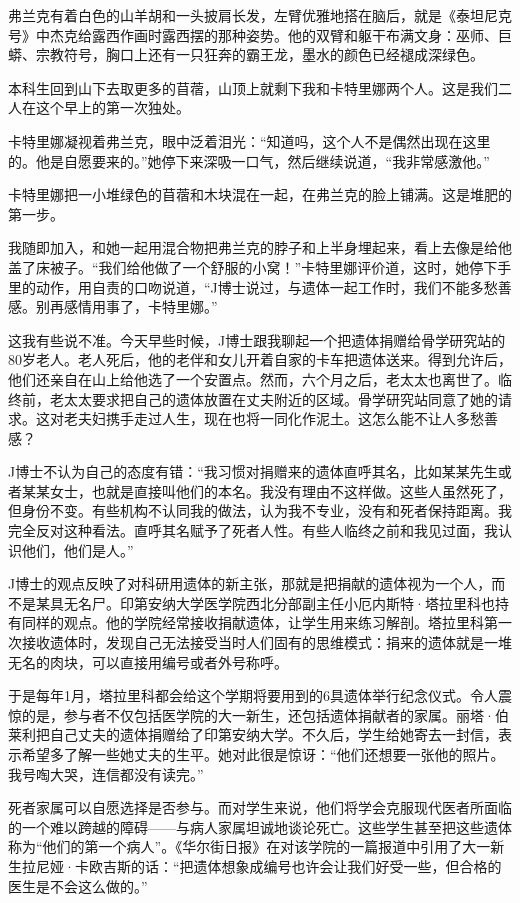\documentclass[12pt,oneside]{book}
\begin{document}
弗兰克有着白色的山羊胡和一头披肩长发，左臂优雅地搭在脑后，就是《泰坦尼克号》中杰克给露西作画时露西摆的那种姿势。他的双臂和躯干布满文身：巫师、巨蟒、宗教符号，胸口上还有一只狂奔的霸王龙，墨水的颜色已经褪成深绿色。

本科生回到山下去取更多的苜蓿，山顶上就剩下我和卡特里娜两个人。这是我们二人在这个早上的第一次独处。

卡特里娜凝视着弗兰克，眼中泛着泪光：“知道吗，这个人不是偶然出现在这里的。他是自愿要来的。”她停下来深吸一口气，然后继续说道，“我非常感激他。”

卡特里娜把一小堆绿色的苜蓿和木块混在一起，在弗兰克的脸上铺满。这是堆肥的第一步。

我随即加入，和她一起用混合物把弗兰克的脖子和上半身埋起来，看上去像是给他盖了床被子。“我们给他做了一个舒服的小窝！”卡特里娜评价道，这时，她停下手里的动作，用自责的口吻说道，“J博士说过，与遗体一起工作时，我们不能多愁善感。别再感情用事了，卡特里娜。”

这我有些说不准。今天早些时候，J博士跟我聊起一个把遗体捐赠给骨学研究站的80岁老人。老人死后，他的老伴和女儿开着自家的卡车把遗体送来。得到允许后，他们还亲自在山上给他选了一个安置点。然而，六个月之后，老太太也离世了。临终前，老太太要求把自己的遗体放置在丈夫附近的区域。骨学研究站同意了她的请求。这对老夫妇携手走过人生，现在也将一同化作泥土。这怎么能不让人多愁善感？

J博士不认为自己的态度有错：“我习惯对捐赠来的遗体直呼其名，比如某某先生或者某某女士，也就是直接叫他们的本名。我没有理由不这样做。这些人虽然死了，但身份不变。有些机构不认同我的做法，认为我不专业，没有和死者保持距离。我完全反对这种看法。直呼其名赋予了死者人性。有些人临终之前和我见过面，我认识他们，他们是人。”

J博士的观点反映了对科研用遗体的新主张，那就是把捐献的遗体视为一个人，而不是某具无名尸。印第安纳大学医学院西北分部副主任小厄内斯特·塔拉里科也持有同样的观点。他的学院经常接收捐献遗体，让学生用来练习解剖。塔拉里科第一次接收遗体时，发现自己无法接受当时人们固有的思维模式：捐来的遗体就是一堆无名的肉块，可以直接用编号或者外号称呼。

于是每年1月，塔拉里科都会给这个学期将要用到的6具遗体举行纪念仪式。令人震惊的是，参与者不仅包括医学院的大一新生，还包括遗体捐献者的家属。丽塔·伯莱利把自己丈夫的遗体捐赠给了印第安纳大学。不久后，学生给她寄去一封信，表示希望多了解一些她丈夫的生平。她对此很是惊讶：“他们还想要一张他的照片。我号啕大哭，连信都没有读完。”

死者家属可以自愿选择是否参与。而对学生来说，他们将学会克服现代医者所面临的一个难以跨越的障碍——与病人家属坦诚地谈论死亡。这些学生甚至把这些遗体称为“他们的第一个病人”。《华尔街日报》在对该学院的一篇报道中引用了大一新生拉尼娅·卡欧吉斯的话：“把遗体想象成编号也许会让我们好受一些，但合格的医生是不会这么做的。”
\end{document}
